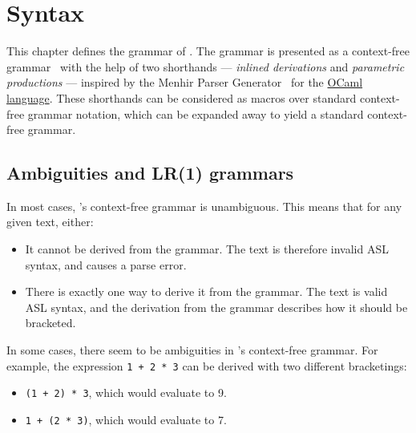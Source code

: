 \chapter{Syntax\label{chap:Syntax}}

This chapter defines the grammar of \ASLvOneterm{}.
The grammar is presented as a context-free grammar~\cite{HU79} with the help of
two shorthands --- \emph{inlined derivations} and \emph{parametric productions} ---
inspired  by the Menhir Parser Generator~\cite{MenhirManual} for the
\href{https://ocaml.org/}{OCaml language}.
These shorthands can be considered as macros over standard context-free grammar
notation, which can be expanded away to yield a standard context-free grammar.

\section*{Ambiguities and LR(1) grammars}

In most cases, \ASLvOneterm{}'s context-free grammar is unambiguous.
This means that for any given text, either:
\begin{itemize}
  \item It cannot be derived from the grammar. The text is therefore invalid
        ASL syntax, and causes a parse error.
  \item There is exactly one way to derive it from the grammar. The text is
        valid ASL syntax, and the derivation from the grammar describes how it
        should be bracketed.
\end{itemize}

In some cases, there seem to be ambiguities in \ASLvOneterm{}'s context-free grammar.
For example, the expression \texttt{1 + 2 * 3} can be derived with two different bracketings:
\begin{itemize}
  \item \texttt{(1 + 2) * 3}, which would evaluate to 9.
  \item \texttt{1 + (2 * 3)}, which would evaluate to 7.
\end{itemize}

